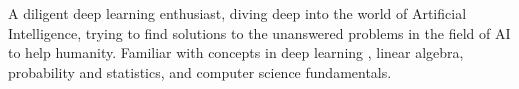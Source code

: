

\begin{cvparagraph}


A diligent deep learning enthusiast, diving deep into the world of Artificial Intelligence, trying to find solutions to the unanswered problems in the field of AI to help humanity. Familiar with concepts in deep learning , linear algebra, probability and statistics, and computer science fundamentals. 

\end{cvparagraph}
